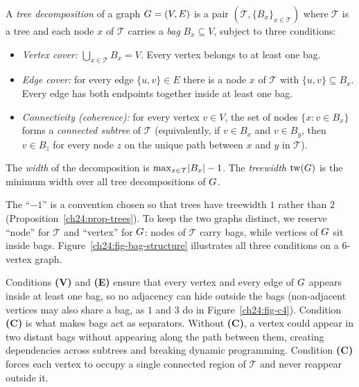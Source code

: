 \begin{definition}
\label{ch24:def-td}
A \emph{tree decomposition} of a graph $G=(V,E)$ is a pair $(\mathcal{T},
\{B_x\}_{x\in \mathcal{T}})$ where $\mathcal{T}$ is a tree and each node $x$ of
$\mathcal{T}$ carries a \emph{bag} $B_x\subseteq V$, subject to three conditions:
\begin{itemize}
  \item[\textbf{(V)}] \emph{Vertex cover:} $\bigcup_{x\in\mathcal{T}} B_x = V$.
        Every vertex belongs to at least one bag.
  \item[\textbf{(E)}] \emph{Edge cover:} for every edge $\{u,v\}\in E$ there is a
        node $x$ of $\mathcal{T}$ with $\{u,v\}\subseteq B_x$. Every edge has both
        endpoints together inside at least one bag.
  \item[\textbf{(C)}] \emph{Connectivity (coherence):} for every vertex $v\in V$,
        the set of nodes $\{x : v\in B_x\}$ forms a \emph{connected subtree} of
        $\mathcal{T}$ (equivalently, if $v\in B_x$ and $v\in B_y$, then $v\in B_z$
        for every node $z$ on the unique path between $x$ and $y$ in $\mathcal{T}$).
\end{itemize}
The \emph{width} of the decomposition is $\max_{x\in\mathcal{T}}\lvert B_x\rvert-1$. The
\emph{treewidth} $\operatorname{tw}(G)$ is the minimum width over all tree decompositions of $G$.
\end{definition}

The ``$-1$'' is a convention chosen so that trees have treewidth $1$
rather than $2$ (Proposition~\ref{ch24:prop-trees}). To keep the two graphs
distinct, we reserve ``node'' for $\mathcal{T}$ and ``vertex'' for $G$: nodes of
$\mathcal{T}$ carry bags, while vertices of $G$ sit inside bags.
Figure~\ref{ch24:fig-bag-structure} illustrates all three conditions on a
$6$-vertex graph.

\begin{focusbox}
Conditions \textbf{(V)} and \textbf{(E)} ensure that every vertex and every edge of
$G$ appears inside at least one bag, so no adjacency can hide outside the bags
(non-adjacent vertices may also share a bag, as $1$ and $3$ do in Figure~\ref{ch24:fig-c4}).
Condition \textbf{(C)} is what makes bags act as separators. Without \textbf{(C)},
a vertex could appear in two distant bags without appearing along the path between
them, creating dependencies across subtrees and breaking dynamic programming.
Condition \textbf{(C)} forces each vertex to occupy a single connected region of
$\mathcal{T}$ and never reappear outside it.
\end{focusbox}

